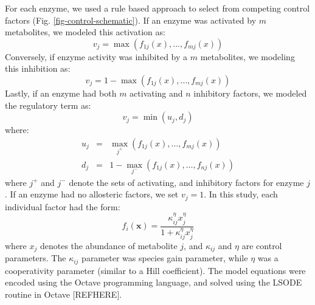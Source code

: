 \documentclass[12pt]{article}
\begin{document}
For each enzyme, we used a rule based approach to select from competing control factors (Fig. \ref{fig-control-schematic}). 
If an enzyme was activated by $m$ metabolites, we modeled this activation as:
\begin{equation}
	v_{j} = \max\left(f_{1j}\left(x\right),\hdots,f_{mj}\left(x\right)\right)
\end{equation}Conversely, if enzyme activity was inhibited by a $m$ metabolites, we modeling this inhibition as:
\begin{equation}
	v_{j} = 1 - \max\left(f_{1j}\left(x\right),\hdots,f_{mj}\left(x\right)\right)
\end{equation}Lastly, if an enzyme had both $m$ activating and $n$ inhibitory factors, we modeled the regulatory term as:
\begin{equation}
	v_{j} = \min\left(u_{j},d_{j}\right)
\end{equation}where:
\begin{eqnarray}
	u_{j} &=& \max_{j^{+}}\left(f_{1j}\left(x\right),\hdots,f_{mj}\left(x\right)\right) \\
	d_{j} &=& 1 - \max_{j^{-}}\left(f_{1j}\left(x\right),\hdots,f_{nj}\left(x\right)\right)
\end{eqnarray}where $j^{+}$ and $j^{-}$ denote the sets of activating, and inhibitory factors for enzyme $j$. 
If an enzyme had no allosteric factors, we set $v_{j} = 1$.
In this study, each individual factor had the form:
\begin{equation}\label{eqn:control-factor}
	f_{i}\left(\mathbf{x}\right) = \frac{\kappa_{ij}^{\eta}x_{j}^{\eta}}{1 + \kappa_{ij}^{\eta}x_{j}^{\eta}}
\end{equation}where $x_{j}$ denotes the abundance of metabolite $j$, and $\kappa_{ij}$ and $\eta$ are control parameters. 
The $\kappa_{ij}$ parameter was species gain parameter, while $\eta$ was a cooperativity parameter (similar to a Hill coefficient).
The model equations were encoded using the Octave programming language, and solved using the LSODE routine in Octave [REFHERE].
\end{document}
